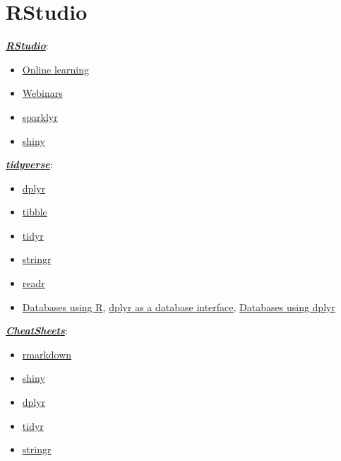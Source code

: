 \documentclass[]{book}
\begin{document}
\section{RStudio}\label{rstudio-links}

\href{https://www.rstudio.com}{\textbf{\emph{RStudio}}}:

\begin{itemize}
\item
  \href{https://www.rstudio.com/online-learning}{Online learning}
\item
  \href{https://resources.rstudio.com/webinars}{Webinars}
\item
  \href{https://spark.rstudio.com/}{sparklyr}
\item
  \href{http://shiny.rstudio.com}{shiny}
\end{itemize}

\href{https://www.tidyverse.org/}{\textbf{\emph{tidyverse}}}:

\begin{itemize}
\item
  \href{https://dplyr.tidyverse.org}{dplyr}
\item
  \href{https://tibble.tidyverse.org}{tibble}
\item
  \href{https://tidyr.tidyverse.org}{tidyr}
\item
  \href{https://stringr.tidyverse.org}{stringr}
\item
  \href{https://readr.tidyverse.org}{readr}
\item
  \href{https://db.rstudio.com}{Databases using R},
  \href{https://db.rstudio.com/overview}{dplyr as a database interface},
  \href{https://db.rstudio.com/dplyr}{Databases using dplyr}
\end{itemize}

\href{https://resources.rstudio.com/rstudio-cheatsheets}{\textbf{\emph{CheatSheets}}}:

\begin{itemize}
\item
  \href{https://resources.rstudio.com/rstudio-cheatsheets/rmarkdown-2-0-cheat-sheet}{rmarkdown}
\item
  \href{https://resources.rstudio.com/rstudio-cheatsheets/shiny-cheat-sheet}{shiny}
\item
  \href{https://github.com/rstudio/cheatsheets/blob/master/data-transformation.pdf}{dplyr}
\item
  \href{https://github.com/rstudio/cheatsheets/blob/master/data-import.pdf}{tidyr}
\item
  \href{https://resources.rstudio.com/rstudio-cheatsheets/stringr-cheat-sheet}{stringr}
\end{itemize}
\end{document}
